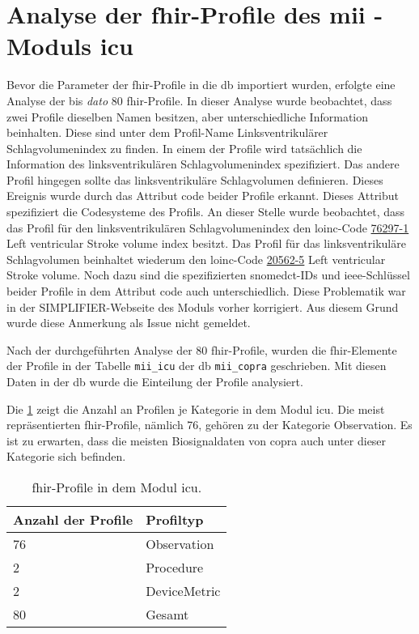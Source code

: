 \section{Analyse der \acs{fhir}-Profile des \acs{mii} - Moduls \acs{icu}} \label{sec:fhiricuresult}

Bevor die Parameter der \ac{fhir}-Profile in die \ac{db} importiert wurden, erfolgte eine Analyse der bis \textit{dato} 80 \ac{fhir}-Profile. In dieser Analyse wurde beobachtet, dass zwei Profile dieselben Namen besitzen, aber unterschiedliche Information beinhalten. Diese sind unter dem Profil-Name \glqq Linksventrikulärer Schlagvolumenindex\grqq{} zu finden. In einem der Profile wird tatsächlich die Information des linksventrikulären Schlagvolumenindex spezifiziert. Das andere Profil hingegen sollte das linksventrikuläre Schlagvolumen definieren. Dieses Ereignis wurde durch das Attribut \glqq code\grqq{} beider Profile erkannt. Dieses Attribut spezifiziert die Codesysteme des Profils. An dieser Stelle wurde beobachtet, dass das Profil für den linksventrikulären Schlagvolumenindex den \ac{loinc}-Code \href{https://loinc.org/76297-1/}{76297-1} \glqq Left ventricular Stroke volume index\grqq{} besitzt. Das Profil für das linksventrikuläre Schlagvolumen beinhaltet wiederum den \ac{loinc}-Code \href{https://loinc.org/20562-5/}{20562-5} \glqq Left ventricular Stroke volume\grqq{}. Noch dazu sind die spezifizierten \ac{snomedct}-IDs und \ac{ieee}-Schlüssel beider Profile in dem Attribut \glqq code\grqq{} auch unterschiedlich. Diese Problematik war in der SIMPLIFIER-Webseite des Moduls vorher korrigiert. Aus diesem Grund wurde diese Anmerkung als Issue nicht gemeldet.

Nach der durchgeführten Analyse der 80 \acs{fhir}-Profile, wurden die \ac{fhir}-Elemente der Profile in der Tabelle \texttt{mii\_icu} der \ac{db} \texttt{mii\_copra} geschrieben. Mit diesen Daten in der \ac{db} wurde die Einteilung der Profile analysiert.

Die \ref{tab:proficu} zeigt die Anzahl an Profilen je Kategorie in dem Modul \glqq\ac{icu}\grqq{}. Die meist repräsentierten \ac{fhir}-Profile, nämlich 76, gehören zu der Kategorie \glqq Observation\grqq{}. Es ist zu erwarten, dass die meisten Biosignaldaten von \ac{copra} auch unter dieser Kategorie sich befinden.

\begin{table}[ht]
	\centering 
	\caption[\acs{fhir}-Profile in dem Modul \acs{icu}]{\acs{fhir}-Profile in dem Modul \acs{icu}.}
	\label{tab:proficu}
	\begin{tabular}{|l|l|}
		\hline
		\bfseries Anzahl der Profile & \bfseries Profiltyp \\ \hline
		76 & Observation \\ \hline
		2 & Procedure \\ \hline   
		2 & DeviceMetric \\ \hline
		80 & Gesamt \\ \hline
	\end{tabular}
\end{table}

